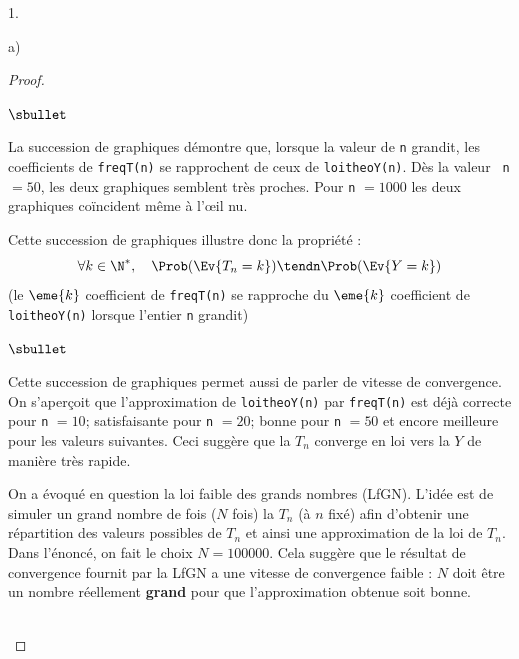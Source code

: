 \documentclass[11pt]{article}%
\begin{document}
\begin{noliste}{1.}
\begin{noliste}{a)}
\begin{proof}
\begin{noliste}{$\sbullet$}
      \item La succession de graphiques démontre que, lorsque la valeur
        de {\tt n} grandit, les coefficients de {\tt freqT(n)} se
        rapprochent de ceux de {\tt loitheoY(n)}. Dès la valeur {\tt
          n} $= 50$, les deux graphiques semblent très proches. Pour
        {\tt n} $= 1000$ les deux graphiques coïncident même à
        l'\oe{}il nu.

      \item Cette succession de graphiques illustre donc la propriété :
        \[
        \forall k \in \N^*, \quad \Prob(\Ev{T_n = k}) \tendn
        \Prob(\Ev{Y = k})
        \]
        (le $\eme{k}$ coefficient de {\tt freqT(n)} se rapproche du
        $\eme{k}$ coefficient de {\tt loitheoY(n)} lorsque l'entier
        {\tt n} grandit)
      \end{noliste}
      \begin{remark}%
        \begin{noliste}{$\sbullet$}
        \item Cette succession de graphiques permet aussi de parler de
          vitesse de convergence. On s'aperçoit que l'approximation de
          {\tt loitheoY(n)} par {\tt freqT(n)} est déjà correcte pour
          {\tt n} $=10$; satisfaisante pour {\tt n} $=20$; bonne pour
          {\tt n} $=50$ et encore meilleure pour les valeurs
          suivantes. Ceci suggère que la \var $T_n$ converge en loi
          vers la \var $Y$ de manière très rapide.
        \item On a évoqué en question  la loi faible des
          grands nombres (LfGN). L'idée est de simuler un grand nombre
          de fois ($N$ fois) la \var $T_n$ (à $n$ fixé) afin d'obtenir
          une répartition des valeurs possibles de $T_n$ et ainsi une
          approximation de la loi de $T_n$. Dans l'énoncé, on fait le
          choix $N = 100000$. Cela suggère que le résultat de
          convergence fournit par la LfGN a une vitesse de convergence
          faible : $N$ doit être un nombre réellement {\bf grand} pour
          que l'approximation obtenue soit bonne.
        \end{noliste}
      \end{remark}~\\[-1.4cm]
    \end{proof}    
  \end{noliste}
\end{noliste}
\end{document}
